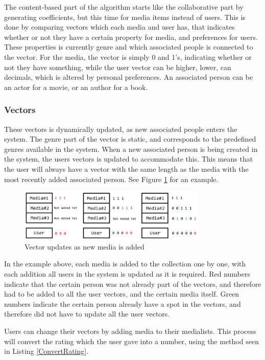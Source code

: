 The content-based part of the algorithm starts like the collaborative part by generating coefficients, but this time for media items instead of users. This is done by comparing vectors which each media and user has, that indicates whether or not they have a certain property for media, and preferences for users. These properties is currently genre and which associated people is connected to the vector. For the media, the vector is simply 0 and 1’s, indicating whether or not they have something, while the user vector can be higher, lower, can decimals, which is altered by personal preferences. An associated person can be an actor for a movie, or an author for a book.

\subsubsection{Vectors}

These vectors is dynamically updated, as new associated people enters the system. The genre part of the vector is static, and corresponds to the predefined genres available in the system. When a new associated person is being created in the system, the users vectors is updated to accommodate this. This means that the user will always have a vector with the same length as the media with the most recently added associated person. See Figure \ref{VectorUpdate} for an example.

\begin{figure}[htb]
\centering
\includegraphics[width=0.8\textwidth]{Images/VectorUpdate.png}
\caption{Vector updates as new media is added}
\label{VectorUpdate}
\end{figure}

In the example above, each media is added to the collection one by one, with each addition all users in the system is updated as it is required. Red numbers indicate that the certain person was not already part of the vectors, and therefore had to be added to all the user vectors, and the certain media itself. Green numbers indicate the certain person already have a spot in the vectors, and therefore did not have to update all the user vectors.

Users can change their vectors by adding media to their medialists. This process will convert the rating which the user gave into a number, using the method seen in Listing \ref{ConvertRating}.

